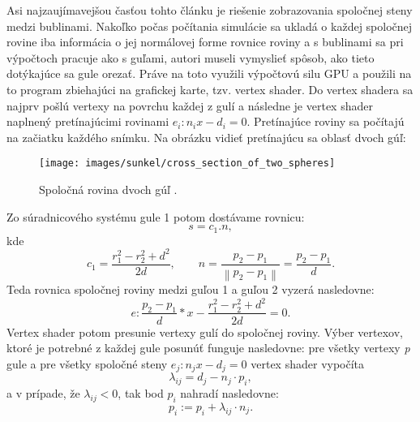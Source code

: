 Asi najzaujímavejšou časťou tohto článku je riešenie zobrazovania spoločnej steny medzi bublinami. Nakoľko počas počítania simulácie sa ukladá o každej spoločnej rovine iba informácia o jej normálovej forme rovnice roviny a s bublinami sa pri výpočtoch pracuje ako s guľami, autori museli vymyslieť spôsob, ako tieto dotýkajúce sa gule orezať. Práve na toto využili výpočtovú silu GPU a použili na to program zbiehajúci na grafickej karte, tzv. vertex shader. Do vertex shadera sa najprv pošlú vertexy na povrchu každej z gulí a následne je vertex shader naplnený pretínajúcimi rovinami $e_{i}: n_{i}x - d_{i} = 0$. Pretínajúce roviny sa počítajú na začiatku každého snímku. Na obrázku  vidieť pretínajúcu sa oblasť dvoch gúľ:
\begin{figure}[H]
	\begin{center}
		\texttt{[image: images/sunkel/cross\_section\_of\_two\_spheres]}
		\caption{Spoločná rovina dvoch gúľ \cite{sunkel2004}.}
		\label{img:cross_section_of_two_spheres}
	\end{center}
\end{figure}
\noindent Zo súradnicového systému gule 1 potom dostávame rovnicu:
\begin{equation}
	\label{eq:sunkel:s}
	s = c_{1}.n,
\end{equation}
kde
\begin{equation}
	\label{eq:sunkel:c1_n}
	c_{1} = \frac{r_{1}^{2} - r_{2}^{2} + d^{2}}{2d}, \qquad n = \frac{p_{2} - p_{1}}{\left \| p_{2} - p_{1} \right \|} = \frac{p_{2} - p_{1}}{d}.
\end{equation}
Teda rovnica spoločnej roviny medzi guľou 1 a guľou 2 vyzerá nasledovne:
\begin{equation}
	\label{eq:sunkel:common_plane}
	e: \frac{p_{2} - p_{1}}{d}\ast x - \frac{r_{1}^{2} - r_{2}^{2} + d^{2}}{2d} = 0.
\end{equation}
Vertex shader potom presunie vertexy gulí do spoločnej roviny. Výber vertexov, ktoré je potrebné z každej gule posunúť funguje nasledovne: pre všetky vertexy \textit{p} gule a pre všetky spoločné steny $e_{j}: n_{j}x - d_{j} = 0$ vertex shader vypočíta
\begin{equation}
	\label{eq:sunkel:lambda}
	\lambda _{ij} = d_{j} - n_{j}\cdot p_{i},
\end{equation}
a v prípade, že $\lambda _{ij} < 0$, tak bod $p_{i}$ nahradí nasledovne:
\begin{equation}
	\label{eq:sunkel:vertex_displacement}
	p_{i} := p_{i} + \lambda _{ij} \cdot n_{j}.
\end{equation}
